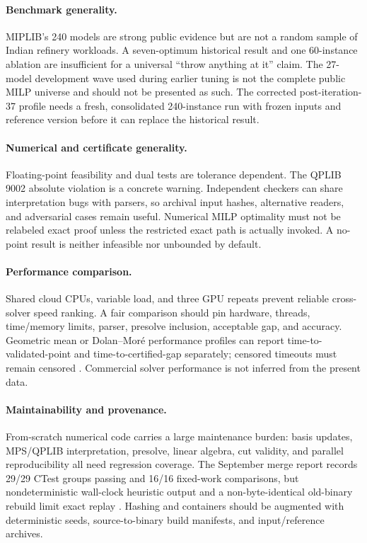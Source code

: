 \documentclass[10pt,a4paper,twocolumn]{article}
\begin{document}
\paragraph{Benchmark generality.} MIPLIB's 240 models are strong public evidence but are not a random sample of Indian refinery workloads. A seven-optimum historical result and one 60-instance ablation are insufficient for a universal ``throw anything at it'' claim. The 27-model development wave used during earlier tuning is not the complete public MILP universe and should not be presented as such. The corrected post-iteration-37 profile needs a fresh, consolidated 240-instance run with frozen inputs and reference version before it can replace the historical result.

\paragraph{Numerical and certificate generality.} Floating-point feasibility and dual tests are tolerance dependent. The QPLIB 9002 absolute violation is a concrete warning. Independent checkers can share interpretation bugs with parsers, so archival input hashes, alternative readers, and adversarial cases remain useful. Numerical MILP optimality must not be relabeled exact proof unless the restricted exact path is actually invoked. A no-point result is neither infeasible nor unbounded by default.

\paragraph{Performance comparison.} Shared cloud CPUs, variable load, and three GPU repeats prevent reliable cross-solver speed ranking. A fair comparison should pin hardware, threads, time/memory limits, parser, presolve inclusion, acceptable gap, and accuracy. Geometric mean or Dolan--Mor\'e performance profiles can report time-to-validated-point and time-to-certified-gap separately; censored timeouts must remain censored \cite{dolanmore2002}. Commercial solver performance is not inferred from the present data.

\paragraph{Maintainability and provenance.} From-scratch numerical code carries a large maintenance burden: basis updates, MPS/QPLIB interpretation, presolve, linear algebra, cut validity, and parallel reproducibility all need regression coverage. The September merge report records 29/29 CTest groups passing and 16/16 fixed-work comparisons, but nondeterministic wall-clock heuristic output and a non-byte-identical old-binary rebuild limit exact replay \cite{merge}. Hashing and containers should be augmented with deterministic seeds, source-to-binary build manifests, and input/reference archives.
\end{document}
